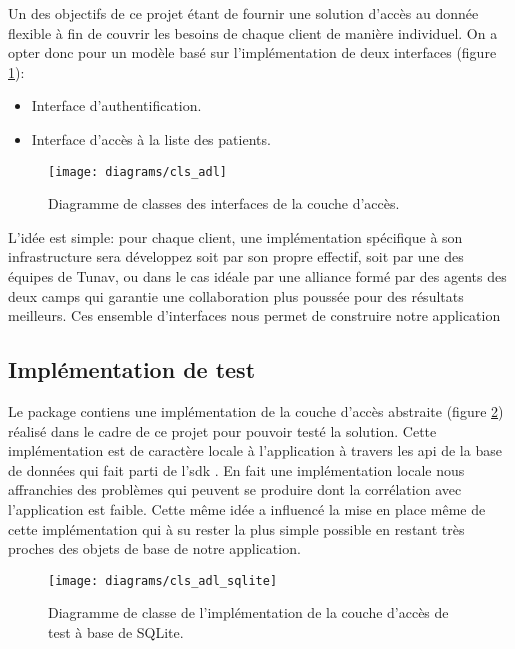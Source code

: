 Un des objectifs de ce projet étant de fournir une solution d’accès au
donnée flexible à fin de couvrir les besoins de chaque client de manière
individuel. On a opter donc pour un modèle basé sur l’implémentation de
deux interfaces (figure \ref{fig:adl}):

\begin{itemize}
\item Interface d'authentification.
\item Interface d’accès à la liste des patients.
\end{itemize}

\begin{figure}
\center
\texttt{[image: diagrams/cls\_adl]}
\caption{Diagramme de classes des interfaces de la couche d’accès.}
\label{fig:adl}
\end{figure}

L'idée est simple: pour chaque client, une implémentation spécifique à son infrastructure sera développez soit par son propre effectif, soit par une des équipes de Tunav, ou dans le cas idéale par une alliance formé par des agents des deux camps qui garantie une collaboration plus poussée pour des résultats meilleurs.
Ces ensemble d'interfaces nous permet de construire notre application 

\subsection{Implémentation de test} 

Le package  contiens une
implémentation de la couche d’accès abstraite (figure
\ref{fig:adl_sqlite}) réalisé dans le cadre de ce projet pour pouvoir
testé la solution. Cette implémentation est de caractère locale à
l'application à travers les \gls{api} de la base de données 
qui fait parti de l'\gls{sdk} \android{}. En fait une implémentation
locale nous affranchies des problèmes qui peuvent se produire dont la
corrélation avec l'application est faible. Cette même idée a influencé
la mise en place même de cette implémentation qui à su rester la plus
simple possible en restant très proches des objets de base de notre
application.

\begin{figure}
\center
\texttt{[image: diagrams/cls\_adl\_sqlite]}
\caption{Diagramme de classe de l'implémentation de la couche d'accès de test à base de SQLite.}
\label{fig:adl_sqlite}
\end{figure}

